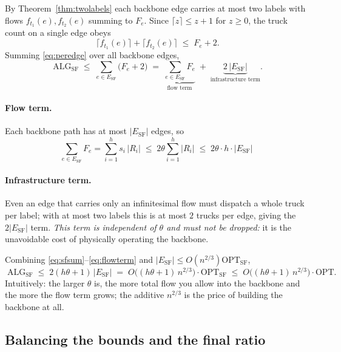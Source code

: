 \documentclass[11pt]{article}
\theoremstyle{definition}
\theoremstyle{remark}
\newcommand{\OPT}{\mathrm{OPT}}
\newcommand{\OPTSF}{\OPT_{\mathrm{SF}}}
\newcommand{\ALG}{\mathrm{ALG}}
\newcommand{\ALGSF}{\ALG_{\mathrm{SF}}}
\newcommand{\ESF}{E_{\mathrm{SF}}}
\begin{document}
By Theorem~\ref{thm:twolabels} each backbone edge carries at most two labels with flows
$f_{t_1}(e),f_{t_2}(e)$ summing to $F_e$. Since $\lceil z\rceil\le z+1$ for $z\ge 0$, the truck count
on a single edge obeys
\begin{equation}\label{eq:peredge}
  \lceil f_{t_1}(e)\rceil+\lceil f_{t_2}(e)\rceil \;\le\; F_e+2 .
\end{equation}
Summing \eqref{eq:peredge} over all backbone edges,
\begin{equation}\label{eq:sfsum}
  \ALGSF \;\le\; \sum_{e\in\ESF}\big(F_e+2\big)
  \;=\;\underbrace{\sum_{e\in\ESF}F_e}_{\text{flow term}}
  \;+\;\underbrace{2\,|\ESF|}_{\text{infrastructure term}} .
\end{equation}

\paragraph{Flow term.} Each backbone path has at most $|\ESF|$ edges, so
\begin{equation}\label{eq:flowterm}
  \sum_{e\in\ESF}F_e=\sum_{i=1}^{h} s_i\,|R_i|
  \;\le\; 2\theta\sum_{i=1}^{h}|R_i|
  \;\le\; 2\theta\cdot h\cdot|\ESF|
  \;
\end{equation}

\paragraph{Infrastructure term.} Even an edge that carries only an infinitesimal flow must dispatch a
whole truck per label; with at most two labels this is at most $2$ trucks per edge, giving the
$2|\ESF|$ term. \emph{This term is independent of $\theta$ and must not be dropped:} it is the
unavoidable cost of physically operating the backbone.

Combining \eqref{eq:sfsum}--\eqref{eq:flowterm} and $|\ESF|\le O(n^{2/3})\OPTSF$,
\begin{equation}\label{eq:sf}
  \boxed{\;\ALGSF \;\le\; 2(h\theta+1)\,|\ESF|
  \;=\; O\!\big((h\theta+1)\,n^{2/3}\big)\cdot\OPTSF
  \;\le\; O\!\big((h\theta+1)\,n^{2/3}\big)\cdot\OPT.\;}
\end{equation}
Intuitively: the larger $\theta$ is, the more total flow you allow into the backbone and the more the
flow term grows; the additive $n^{2/3}$ is the price of building the backbone at all.

\subsection{Balancing the bounds and the final ratio}
\end{document}
